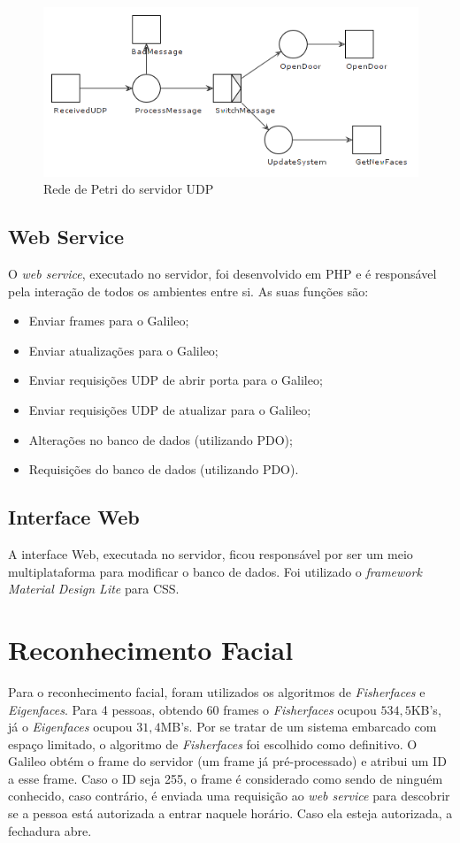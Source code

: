 \documentclass[12pt]{article}
\begin{document}
    \begin{figure}[ht]
		\centering
		\includegraphics[width=.7\textwidth]{petri-udp}
		\caption{Rede de Petri do servidor UDP}
		\label{fig:petri-udp}
	\end{figure}

\subsection{Web Service}
    O \textit{web service}, executado no servidor, foi desenvolvido em PHP e é responsável pela interação de todos os ambientes entre si. As suas funções são:
    \begin{itemize}
        \item Enviar frames para o Galileo;
        \item Enviar atualizações para o Galileo;
        \item Enviar requisições UDP de abrir porta para o Galileo;
        \item Enviar requisições UDP de atualizar para o Galileo;
        \item Alterações no banco de dados (utilizando PDO);
        \item Requisições do banco de dados (utilizando PDO).
    \end{itemize}

\subsection{Interface Web}
    A interface Web, executada no servidor, ficou responsável por ser um meio
    multiplataforma para modificar o banco de dados. Foi utilizado o \textit{framework Material Design Lite} para CSS.

\section{Reconhecimento Facial}
    Para o reconhecimento facial, foram utilizados os algoritmos de	\textit{Fisherfaces} e \textit{Eigenfaces}. Para 4 pessoas, obtendo 60 frames
    o \textit{Fisherfaces} ocupou $534,5$KB's, já o \textit{Eigenfaces} ocupou
    $31,4$MB's. Por se tratar de um sistema embarcado com espaço limitado, o 
    algoritmo de \textit{Fisherfaces} foi escolhido como definitivo.
    O Galileo obtém o frame do servidor (um frame já pré-processado) e atribui
    um ID a esse frame. Caso o ID seja 255, o frame é considerado como sendo de
    ninguém conhecido, caso contrário, é enviada uma requisição ao
    \textit{web service} para descobrir se a pessoa está autorizada a entrar
    naquele horário. Caso ela esteja autorizada, a fechadura abre.
\end{document}
